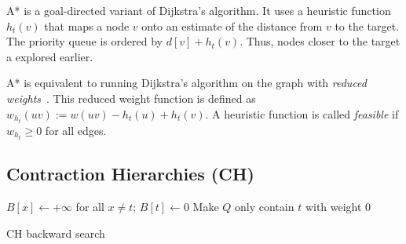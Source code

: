 \documentclass[manuscript,review]{acmart}
\begin{document}
A* is a goal-directed variant of Dijkstra's algorithm.
It uses a heuristic function $h_t(v)$ that maps a node $v$ onto an estimate of the distance from $v$ to the target.
The priority queue is ordered by $d[v] + h_t(v)$.
Thus, nodes closer to the target a explored earlier.

A* is equivalent to running Dijkstra's algorithm on the graph with \emph{reduced weights}~\cite{hnr-afbhd-68}.
This reduced weight function is defined as $w_{h_t}(uv) := w(uv) - h_t(u) + h_t(v)$.
A heuristic function is called \emph{feasible} if $w_{h_t} \geq 0$ for all edges.

\subsection{Contraction Hierarchies (CH)}

\begin{algorithm2e}
$B[x] \leftarrow +\infty$ for all $x\neq t$;
$B[t] \leftarrow 0$\;
Make $Q$ only contain $t$ with weight $0$\;
\caption{CH backward search}
\label{algo:ch-backward}
\end{algorithm2e}
\end{document}

